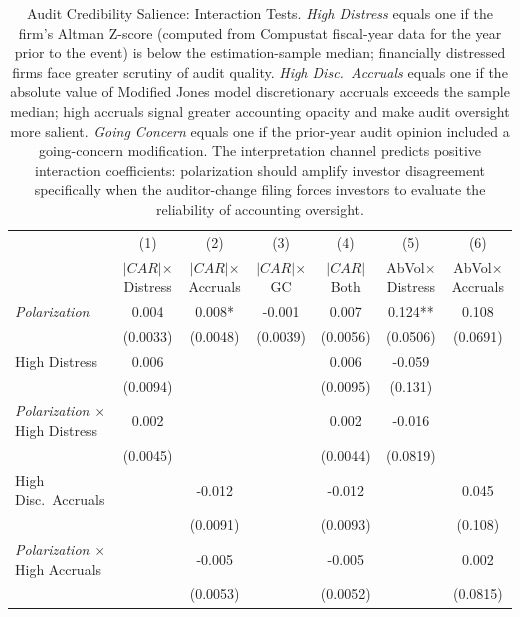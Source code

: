 \begin{table}[htbp]
\centering
\caption{Audit Credibility Salience: Interaction Tests. \textit{High Distress} equals one if the firm's Altman Z-score (computed from Compustat fiscal-year data for the year prior to the event) is below the estimation-sample median; financially distressed firms face greater scrutiny of audit quality. \textit{High Disc.\ Accruals} equals one if the absolute value of Modified Jones model discretionary accruals exceeds the sample median; high accruals signal greater accounting opacity and make audit oversight more salient. \textit{Going Concern} equals one if the prior-year audit opinion included a going-concern modification. The interpretation channel predicts positive interaction coefficients: polarization should amplify investor disagreement specifically when the auditor-change filing forces investors to evaluate the reliability of accounting oversight.}
\label{tab:audit_credibility}
\begin{tabular}{lcccccc}
\toprule
 & (1) & (2) & (3) & (4) & (5) & (6) \\
 & $|CAR|$\newline $\times$ Distress & $|CAR|$\newline $\times$ Accruals & $|CAR|$\newline $\times$ GC & $|CAR|$\newline Both & AbVol\newline $\times$ Distress & AbVol\newline $\times$ Accruals \\
\midrule
\textit{Polarization} & 0.004 & 0.008* & -0.001 & 0.007 & 0.124** & 0.108 \\
 & (0.0033) & (0.0048) & (0.0039) & (0.0056) & (0.0506) & (0.0691) \\
High Distress & 0.006 &  &  & 0.006 & -0.059 &  \\
 & (0.0094) &  &  & (0.0095) & (0.131) &  \\
\textit{Polarization} $\times$ High Distress & 0.002 &  &  & 0.002 & -0.016 &  \\
 & (0.0045) &  &  & (0.0044) & (0.0819) &  \\
High Disc.\ Accruals &  & -0.012 &  & -0.012 &  & 0.045 \\
 &  & (0.0091) &  & (0.0093) &  & (0.108) \\
\textit{Polarization} $\times$ High Accruals &  & -0.005 &  & -0.005 &  & 0.002 \\
 &  & (0.0053) &  & (0.0052) &  & (0.0815) \\

\end{tabular}
\end{table}
